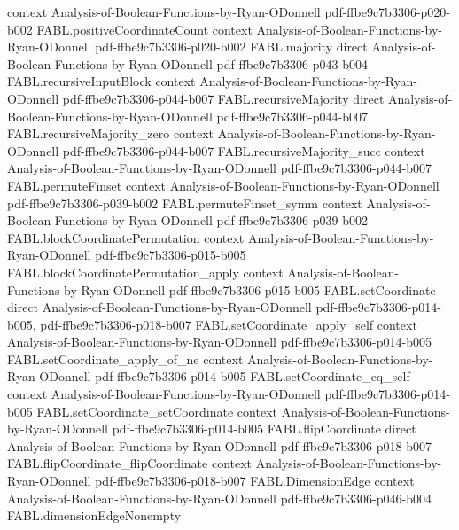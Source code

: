 \begin{theorem}
  {context}
  {Analysis-of-Boolean-Functions-by-Ryan-ODonnell}
  {pdf-ffbe9c7b3306-p020-b002}
\proofstep
  {FABL.positiveCoordinateCount}
  {context}
  {Analysis-of-Boolean-Functions-by-Ryan-ODonnell}
  {pdf-ffbe9c7b3306-p020-b002}
\proofstep
  {FABL.majority}
  {direct}
  {Analysis-of-Boolean-Functions-by-Ryan-ODonnell}
  {pdf-ffbe9c7b3306-p043-b004}
\proofstep
  {FABL.recursiveInputBlock}
  {context}
  {Analysis-of-Boolean-Functions-by-Ryan-ODonnell}
  {pdf-ffbe9c7b3306-p044-b007}
\proofstep
  {FABL.recursiveMajority}
  {direct}
  {Analysis-of-Boolean-Functions-by-Ryan-ODonnell}
  {pdf-ffbe9c7b3306-p044-b007}
\proofstep
  {FABL.recursiveMajority_zero}
  {context}
  {Analysis-of-Boolean-Functions-by-Ryan-ODonnell}
  {pdf-ffbe9c7b3306-p044-b007}
\proofstep
  {FABL.recursiveMajority_succ}
  {context}
  {Analysis-of-Boolean-Functions-by-Ryan-ODonnell}
  {pdf-ffbe9c7b3306-p044-b007}
\proofstep
  {FABL.permuteFinset}
  {context}
  {Analysis-of-Boolean-Functions-by-Ryan-ODonnell}
  {pdf-ffbe9c7b3306-p039-b002}
\proofstep
  {FABL.permuteFinset_symm}
  {context}
  {Analysis-of-Boolean-Functions-by-Ryan-ODonnell}
  {pdf-ffbe9c7b3306-p039-b002}
\proofstep
  {FABL.blockCoordinatePermutation}
  {context}
  {Analysis-of-Boolean-Functions-by-Ryan-ODonnell}
  {pdf-ffbe9c7b3306-p015-b005}
\proofstep
  {FABL.blockCoordinatePermutation_apply}
  {context}
  {Analysis-of-Boolean-Functions-by-Ryan-ODonnell}
  {pdf-ffbe9c7b3306-p015-b005}
\proofstep
  {FABL.setCoordinate}
  {direct}
  {Analysis-of-Boolean-Functions-by-Ryan-ODonnell}
  {pdf-ffbe9c7b3306-p014-b005,
    pdf-ffbe9c7b3306-p018-b007}
\proofstep
  {FABL.setCoordinate_apply_self}
  {context}
  {Analysis-of-Boolean-Functions-by-Ryan-ODonnell}
  {pdf-ffbe9c7b3306-p014-b005}
\proofstep
  {FABL.setCoordinate_apply_of_ne}
  {context}
  {Analysis-of-Boolean-Functions-by-Ryan-ODonnell}
  {pdf-ffbe9c7b3306-p014-b005}
\proofstep
  {FABL.setCoordinate_eq_self}
  {context}
  {Analysis-of-Boolean-Functions-by-Ryan-ODonnell}
  {pdf-ffbe9c7b3306-p014-b005}
\proofstep
  {FABL.setCoordinate_setCoordinate}
  {context}
  {Analysis-of-Boolean-Functions-by-Ryan-ODonnell}
  {pdf-ffbe9c7b3306-p014-b005}
\proofstep
  {FABL.flipCoordinate}
  {direct}
  {Analysis-of-Boolean-Functions-by-Ryan-ODonnell}
  {pdf-ffbe9c7b3306-p018-b007}
\proofstep
  {FABL.flipCoordinate_flipCoordinate}
  {context}
  {Analysis-of-Boolean-Functions-by-Ryan-ODonnell}
  {pdf-ffbe9c7b3306-p018-b007}
\proofstep
  {FABL.DimensionEdge}
  {context}
  {Analysis-of-Boolean-Functions-by-Ryan-ODonnell}
  {pdf-ffbe9c7b3306-p046-b004}
\proofstep
  {FABL.dimensionEdgeNonempty}

\end{theorem}
